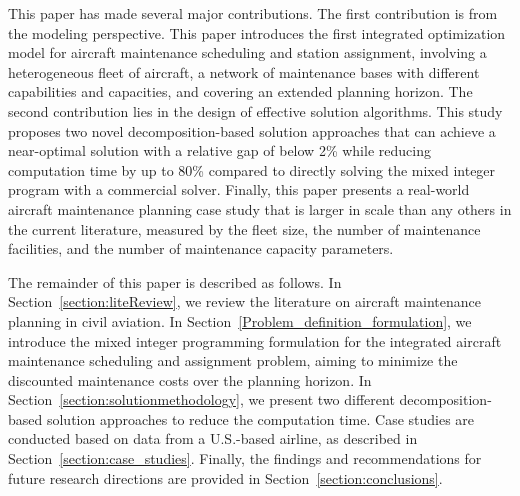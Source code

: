 This paper has made several major contributions. The first contribution is from the modeling perspective. This paper introduces the first integrated optimization model for aircraft maintenance scheduling and station assignment, involving a heterogeneous fleet of aircraft, a network of maintenance bases with different capabilities and capacities, and covering an extended planning horizon. The second contribution lies in the design of effective solution algorithms. This study proposes two novel decomposition-based solution approaches that can achieve a near-optimal solution with a relative gap of below 2\% while reducing computation time by up to 80\% compared to directly solving the mixed integer program with a commercial solver. Finally, this paper presents a real-world aircraft maintenance planning case study that is larger in scale than any others in the current literature, measured by the fleet size, the number of maintenance facilities, and the number of maintenance capacity parameters. 




The remainder of this paper is described as follows. In Section~\ref{section:liteReview}, we review the literature on aircraft maintenance planning in civil aviation. In Section~\ref{Problem_definition_formulation}, we introduce the mixed integer programming formulation for the integrated aircraft maintenance scheduling and assignment problem, aiming to minimize the discounted maintenance costs over the planning horizon. In Section~\ref{section:solutionmethodology}, we present two different decomposition-based solution approaches to reduce the computation time. Case studies are conducted based on data from a U.S.-based airline, as described in Section~\ref{section:case_studies}. Finally, the findings and recommendations for future research directions are provided in Section~\ref{section:conclusions}.



